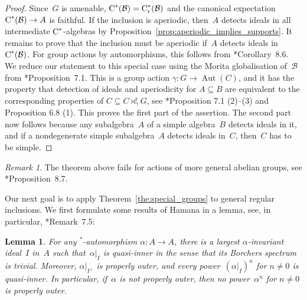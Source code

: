 \documentclass[a4paper]{amsart}
\theoremstyle{plain}
\newtheorem{lemma}[theorem]{Lemma}
\theoremstyle{definition}
\theoremstyle{remark}
\newtheorem{remark}[theorem]{Remark}
\numberwithin{theorem}{section}
\numberwithin{equation}{section}
\DeclareMathOperator{\Aut}{Aut}%
\newcommand*{\nb}{\nobreakdash}
\newcommand*{\Star}{\(^*\)\nobreakdash-}
\newcommand*{\red}{\mathrm{r}}%
\newcommand*{\Cst}{\textup C^*}%
\newcommand*{\B}{\mathcal B}%
\begin{document}
\begin{proof}
  Since~\(G\) is amenable, \(\Cst(\B) = \Cst_\red(\B)\) and the
  canonical expectation \(\Cst(\B)\to A\) is faithful.
  If the inclusion is aperiodic, then~\(A\) detects ideals in all
  intermediate \(\Cst\)\nb-algebras by
  Proposition~\ref{prop:aperiodic_implies_supports}.
  It remains to prove that the inclusion must be aperiodic if~\(A\)
  detects ideals in \(\Cst(\B)\).
  For group actions by automorphisms, this follows from
  \cite{Geffen-Ursu:Simple_crossed_products}*{Corollary~8.6}.
  We reduce our statement to this special case using the Morita
  globalisation of~\(\B\) from
  \cite{Kwasniewski-Meyer:Aperiodicity}*{Proposition~7.1}.
  This is a group action \(\gamma\colon G\to \Aut(C)\), and it has the
  property that detection of ideals and aperiodicity for \(A\subseteq
  B\) are equivalent to the corresponding properties of \(C\subseteq
  C\rtimes_\gamma^\red G\), see
  \cite{Kwasniewski-Meyer:Aperiodicity}*{Proposition 7.1 (2)--(3) and
    Proposition 6.8 (1)}.
  This proves the first part of the assertion.
  The second part now follows because any subalgebra~\(A\) of a simple
  algebra~\(B\) detects ideals in it, and if a nondegenerate simple
  subalgebra~\(A\) detects ideals in~\(C\), then~\(C\) has to be simple.
\end{proof}

\begin{remark}
  The theorem above fails for actions of more general abelian groups,
  see \cite{Geffen-Ursu:Simple_crossed_products}*{Proposition~8.7}.
\end{remark}

Our next goal is to apply Theorem~\ref{the:special_groups} to
general regular inclusions.
We first formulate some results of Hamana in a lemma, see, in
particular, \cite{Hamana:injective-C-dyn}*{Remark~7.5}:

\begin{lemma}
  \label{lem:inductively_not_aperiodic}
  For any \Star{}automorphism \(\alpha\colon A\to A\), there is a
  largest \(\alpha\)\nb-invariant ideal~\(I\) in~\(A\) such
  that~\(\alpha|_I\) is quasi-inner in the sense that its Borchers
  spectrum is trivial.
  Moreover,  \(\alpha|_{I^\bot}\) is properly outer, and every
  power~\((\alpha|_I)^n\) for \(n\neq 0\) is quasi-inner.
  In particular, if~\(\alpha\) is not properly outer, then no
  power~\(\alpha^n\) for \(n\neq 0\) is properly outer.
\end{lemma}
\end{document}
